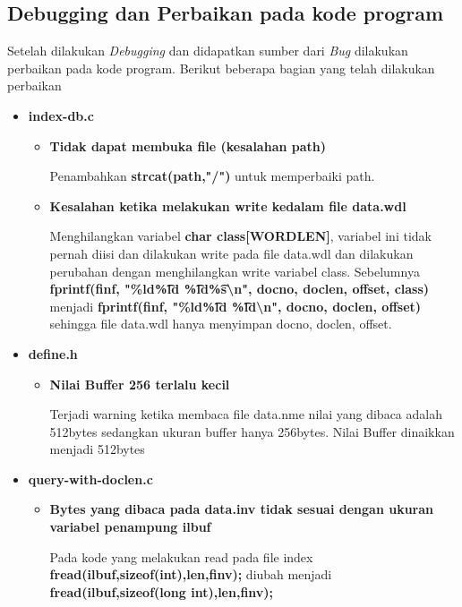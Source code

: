 \documentclass[12pt]{article}
\begin{document}
    \subsection*{Debugging dan Perbaikan pada kode program}
    Setelah dilakukan \textit{Debugging} dan didapatkan sumber dari \textit{Bug} dilakukan perbaikan pada kode program. Berikut beberapa bagian yang telah dilakukan perbaikan

    \begin{itemize}
        \item \textbf{index-db.c}
        \begin{itemize}
            \item \textbf{Tidak dapat membuka file (kesalahan path)}
            \begin{flushleft}
                \justifying
                Penambahkan \textbf{strcat(path,"/")} untuk memperbaiki path.
            \end{flushleft}

            \item \textbf{Kesalahan ketika melakukan write kedalam file data.wdl}
            \begin{flushleft}
                \justifying
                Menghilangkan variabel \textbf{char class[WORDLEN]}, variabel ini tidak pernah diisi dan dilakukan write pada file data.wdl dan dilakukan perubahan dengan menghilangkan write variabel class. 
                Sebelumnya \textbf{fprintf(finf, "\%ld\t \%ld \t\%ld\t \%s\textbackslash n", docno, doclen, offset, class)} menjadi \textbf{fprintf(finf, "\%ld\t \%ld \t\%ld\textbackslash n", docno, doclen, offset)} sehingga file data.wdl hanya menyimpan docno, doclen, offset.
            \end{flushleft}
        \end{itemize}

        \item \textbf{define.h}
        \begin{itemize}
            \item \textbf{Nilai Buffer 256 terlalu kecil }
            \begin{flushleft}
                \justifying
                Terjadi warning ketika membaca file data.nme nilai yang dibaca adalah 512bytes sedangkan ukuran buffer hanya 256bytes. Nilai Buffer dinaikkan menjadi 512bytes
            \end{flushleft}
        \end{itemize}
        
        \item \textbf{query-with-doclen.c}
        \begin{itemize}
            \item \textbf{Bytes yang dibaca pada data.inv tidak sesuai dengan ukuran variabel penampung ilbuf}
            \begin{flushleft}
                \justifying
                Pada kode yang melakukan read pada file index \textbf{fread(ilbuf,sizeof(int),len,finv);} diubah menjadi \textbf{fread(ilbuf,sizeof(long int),len,finv);}
            \end{flushleft}


\end{itemize}
\end{itemize}
\end{document}
